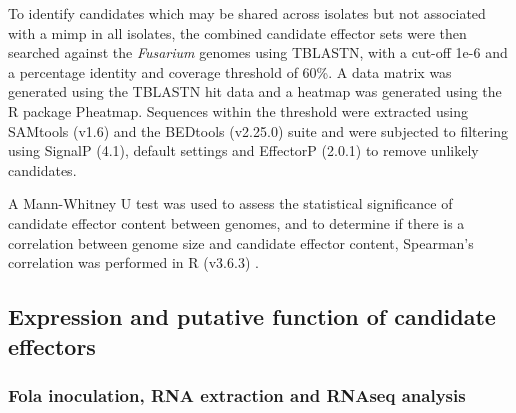 To identify candidates which may be shared across isolates but not associated with a \ac{mimp} in all isolates, the combined candidate effector sets were then searched against the \textit{Fusarium} genomes using TBLASTN, with a cut-off 1e-6 and a percentage identity and coverage threshold of 60\%. A data matrix was generated using the TBLASTN hit data and a heatmap was generated using the R package Pheatmap. Sequences within the threshold were extracted using  SAMtools (v1.6) and the BEDtools (v2.25.0) suite and were subjected to filtering using SignalP (4.1), default settings and EffectorP (2.0.1) to remove unlikely candidates. 

A Mann-Whitney U test was used to assess the statistical significance of candidate effector content between genomes, and to determine if there is a correlation between genome size and candidate effector content, Spearman’s correlation was performed in R (v3.6.3) \parencite{R}.

\subsection{Expression and putative function of candidate effectors}

\subsubsection{\Acf{Fola} inoculation, RNA extraction and RNAseq analysis}

